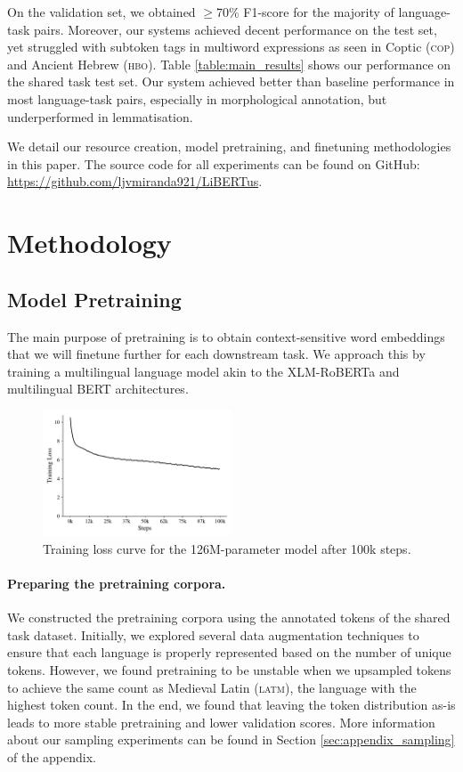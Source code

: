 \documentclass[11pt]{article}
\newcommand{\githuburl}{\url{https://github.com/ljvmiranda921/LiBERTus}}
\begin{document}
On the validation set, we obtained $\geq$70\% F1-score for the majority of language-task pairs.
Moreover, our systems achieved decent performance on the test set, yet struggled with subtoken tags in multiword expressions as seen in Coptic (\textsc{cop}) and Ancient Hebrew (\textsc{hbo}).
Table \ref{table:main_results} shows our performance on the shared task test set.
Our system achieved better than baseline performance in most language-task pairs, especially in morphological annotation, but underperformed in lemmatisation.

We detail our resource creation, model pretraining, and finetuning methodologies in this paper.
The source code for all experiments can be found on GitHub: \githuburl{}.



\section{Methodology}

\subsection{Model Pretraining}

The main purpose of pretraining is to obtain context-sensitive word embeddings that we will finetune further for each downstream task.
We approach this by training a multilingual language model akin to the XLM-RoBERTa \cite{conneau-etal-2020-unsupervised} and multilingual BERT \cite{devlin-etal-2019-bert} architectures.

\begin{figure}[t]
  \centering
  \includegraphics[width=0.5\textwidth]{figures/train_loss.pdf}
  \caption{Training loss curve for the 126M-parameter model after 100k steps.}
  \label{fig:training_curve}
\end{figure}

\paragraph{Preparing the pretraining corpora.}
We constructed the pretraining corpora using the annotated tokens of the shared task dataset.
Initially, we explored several data augmentation techniques to ensure that each language is properly represented based on the number of unique tokens.
However, we found pretraining to be unstable when we upsampled tokens to achieve the same count as Medieval Latin (\textsc{latm}), the language with the highest token count.
In the end, we found that leaving the token distribution as-is leads to more stable pretraining and lower validation scores.
More information about our sampling experiments can be found in Section \ref{sec:appendix_sampling} of the appendix.
\end{document}
